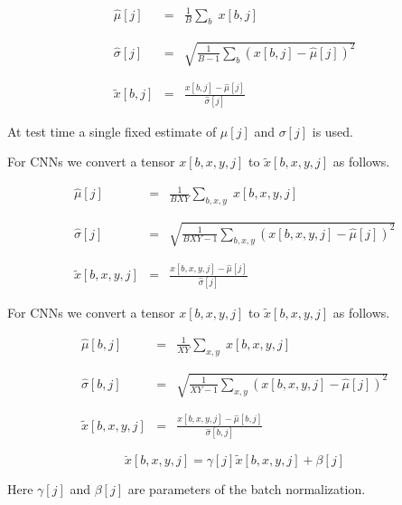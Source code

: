 {\begin{eqnarray*}
  \hat{\mu}[j] & = & \frac{1}{B} \sum_b\;x[b,j] \\
  \\
  \\
  \hat{\sigma}[j] & = & \sqrt{\frac{1}{B-1} \sum_b (x[b,j]-\hat{\mu}[j])^2} \\
  \\
  \\
  \tilde{x}[b,j]& = & \frac{x[b,j] - \hat{\mu}[j]}{\hat{\sigma}[j]}
\end{eqnarray*}


\vfill
At test time a single fixed estimate of $\mu[j]$ and $\sigma[j]$ is used.


For CNNs we convert a tensor $x[b,x,y,j]$ to $\tilde{x}[b,x,y,j]$ as follows.

\begin{eqnarray*}
  \hat{\mu}[j] & = & \frac{1}{BXY} \sum_{b,x,y}\;x[b,x,y,j] \\
  \\
  \\
  \hat{\sigma}[j] & = & \sqrt{\frac{1}{BXY-1} \sum_{b,x,y} (x[b,x,y,j]-\hat{\mu}[j])^2} \\
  \\
  \\
  \tilde{x}[b,x,y,j]& = & \frac{x[b,x,y,j] - \hat{\mu}[j]}{\hat{\sigma}[j]}
\end{eqnarray*}


For CNNs we convert a tensor $x[b,x,y,j]$ to $\tilde{x}[b,x,y,j]$ as follows.

\begin{eqnarray*}
  \hat{\mu}[b,j] & = & \frac{1}{XY} \sum_{x,y}\;x[b,x,y,j] \\
  \\
  \\
  \hat{\sigma}[b,j] & = & \sqrt{\frac{1}{XY-1} \sum_{x,y} (x[b,x,y,j]-\hat{\mu}[j])^2} \\
  \\
  \\
  \tilde{x}[b,x,y,j]& = & \frac{x[b,x,y,j] - \hat{\mu}[b,j]}{\hat{\sigma}[b,j]}
\end{eqnarray*}


$$\breve{x}[b,x,y,j] = \gamma[j] \tilde{x}[b,x,y,j] + \beta[j]$$

\vfill
Here $\gamma[j]$ and $\beta[j]$ are parameters of the batch normalization.

}
